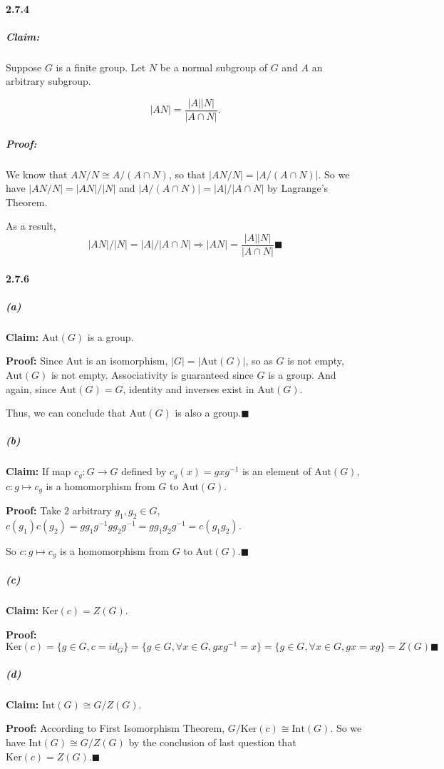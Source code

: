 \documentclass[11pt]{article}
\begin{document}
	\paragraph{2.7.4}
		\subparagraph{Claim:}Suppose $G$ is a finite group. Let $N$ be a normal subgroup of $G$ and $A$ an arbitrary subgroup.
		
		\[|AN| = \frac{|A||N|}{|A \cap N|}.\]
		\subparagraph{Proof:} We know that $AN / N \cong A / (A \cap N)$, so that $|AN / N| = |A / (A \cap N)|$. So we have $|AN / N| = |AN| / |N|$ and $|A / (A \cap N)| = |A| / |A \cap N|$ by Lagrange's Theorem.
		
		As a result, \[|AN|/|N| = |A|/|A \cap N| \Rightarrow |AN| = \frac{|A||N|}{|A \cap N|}\blacksquare\]
	\paragraph{2.7.6}
		\subparagraph{(a)}
			\textbf{Claim:} $\mathrm{Aut}(G)$ is a group.
			
			\textbf{Proof:} Since Aut is an isomorphism, $|G| = |\mathrm{Aut}(G)|$, so as $G$ is not empty, $\mathrm{Aut}(G)$ is not empty. Associativity is guaranteed since $G$ is a group. And again, since $\mathrm{Aut}(G) = G$, identity and inverses exist in $\mathrm{Aut}(G)$.
			
			 Thus, we can conclude that $\mathrm{Aut}(G)$ is  also a group.$\blacksquare$ 
		\subparagraph{(b)}
			\textbf{Claim:}
				If map $c_g: G \rightarrow G$ defined by $c_g(x) = gxg^{-1}$ is an element of $\mathrm{Aut}(G)$, $c: g \mapsto c_g$ is a homomorphism from $G$ to $\mathrm{Aut}(G)$.
				
			\textbf{Proof:} Take $2$ arbitrary $g_1, g_2 \in G$, $c(g_1)c(g_2) = gg_1g^{-1}gg_2g^{-1} = gg_1g_2g^{-1} = c(g_1g_2)$. 
			
			So $c: g \mapsto c_g$ is a homomorphism from $G$ to $\mathrm{Aut}(G)$.$\blacksquare$
				
		\subparagraph{(c)}
			\textbf{Claim:} $\mathrm{Ker}(c) = Z(G)$.
			
			\textbf{Proof:} $\mathrm{Ker}(c) = \{g \in G, c = id_G\} = \{g \in G, \forall x \in G, gxg^{-1} = x\} = \{g \in G, \forall x \in G, gx = xg\} = Z(G)\blacksquare$
			
			
		\subparagraph{(d)}
			\textbf{Claim:} $\mathrm{Int}(G) \cong G / Z(G)$.
			
			\textbf{Proof:} According to First Isomorphism Theorem, $G / \mathrm{Ker}(c) \cong \mathrm{Int}(G)$. So we have $\mathrm{Int}(G) \cong G / Z(G)$ by the conclusion of last question that $\mathrm{Ker}(c) = Z(G)$.$\blacksquare$
		
\end{document}
